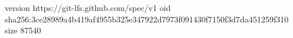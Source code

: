 version https://git-lfs.github.com/spec/v1
oid sha256:3ce28989a4b419af4955b325e347922d7973f091430f7150f3d7da451259f310
size 87540

